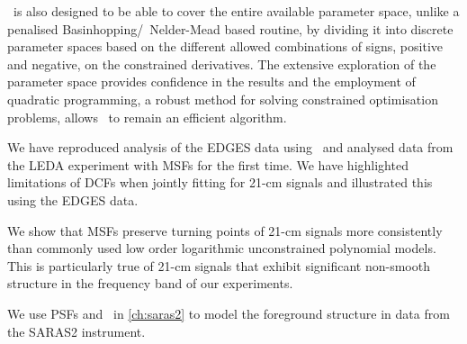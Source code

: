 \maxsmooth~is also designed to be able to cover the entire available parameter space, unlike a penalised Basinhopping/~Nelder-Mead based routine, by dividing it into discrete parameter spaces based on the different allowed combinations of signs, positive and negative, on the constrained derivatives. The extensive exploration of the parameter space provides confidence in the results and the employment of quadratic programming, a robust method for solving constrained optimisation problems, allows \maxsmooth~to remain an efficient algorithm.

We have reproduced analysis of the EDGES data using \maxsmooth~and analysed data from the LEDA experiment with MSFs for the first time. We have highlighted limitations of DCFs when jointly fitting for 21-cm signals and illustrated this using the EDGES data. %

We show that MSFs preserve turning points of 21-cm signals more consistently than commonly used low order logarithmic unconstrained polynomial models. This is particularly true of 21-cm signals that exhibit significant non-smooth structure in the frequency band of our experiments.%


We use PSFs and \maxsmooth~in \cref{ch:saras2} to model the foreground structure in data from the SARAS2 instrument.

